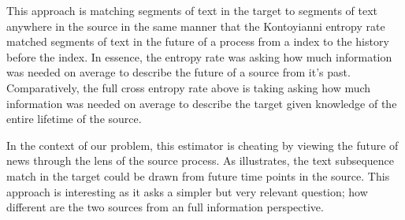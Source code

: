 This approach is matching segments of text in the {\color{target}target} to segments of text anywhere in the {\color{source}source} in the same manner that the Kontoyianni entropy rate matched segments of text in the future of a process from a index to the history before the index. In essence, the entropy rate was asking how much information was needed on average to describe the future of a source from it's past. Comparatively, the full cross entropy rate above is taking asking how much information was needed on average to describe the {\color{target}target} given knowledge of the entire lifetime of the {\color{source}source}. 

In the context of our problem, this estimator is cheating by viewing the future of news through the lens of the source process. As  illustrates, the text subsequence match in the target could be drawn from future time points in the source. This approach is interesting as it asks a simpler but very relevant question; how different are the two sources from an full information perspective.


\begin{figure}
\end{figure}


